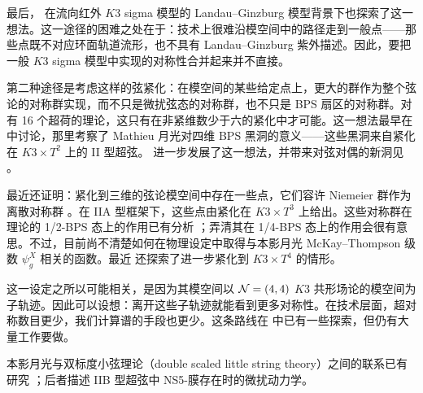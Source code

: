 
最后，\cite{UMLG} 在流向红外 $K3$ sigma 模型的 Landau--Ginzburg 模型背景下也探索了这一想法。这一途径的困难之处在于：技术上很难沿模空间中的路径走到一般点——那些点既不对应环面轨道流形，也不具有 Landau--Ginzburg 紫外描述。因此，要把一般 $K3$ sigma 模型中实现的对称性合并起来并不直接。

 第二种途径是考虑这样的弦紧化：在模空间的某些给定点上，更大的群作为整个弦论的对称群实现，而不只是微扰弦态的对称群，也不只是 BPS 扇区的对称群。对有 16 个超荷的理论，这只有在非紧维数少于六的紧化中才可能。这一想法最早在 \cite{cheng2010k3} 中讨论，那里考察了 Mathieu 月光对四维 BPS 黑洞的意义——这些黑洞来自紧化在 $K3\times T^2$ 上的 II 型超弦。\cite{Persson:2013xpa} 进一步发展了这一想法，并带来对弦对偶的新洞见 \cite{Persson:2015jka}。


最近还证明：紧化到三维的弦论模空间中存在一些点，它们容许 Niemeier 群作为离散对称群 \cite{kachru20173d}。在 IIA 型框架下，这些点由紧化在 $K3\times T^3$ 上给出。这些对称群在理论的 1/2-BPS 态上的作用已有分析 \cite{kachru20173d}；弄清其在 1/4-BPS 态上的作用会很有意思。不过，目前尚不清楚如何在物理设定中取得与本影月光 McKay--Thompson 级数 $\psi^X_g$ 相关的函数。最近 \cite{Zimet:2018dev} 还探索了进一步紧化到 $K3\times T^4$ 的情形。


 这一设定之所以可能相关，是因为其模空间以 ${\cal N}=(4,4)$ $K3$ 共形场论的模空间为子轨迹。因此可以设想：离开这些子轨迹就能看到更多对称性。在技术层面，超对称数目更少，我们计算谱的手段也更少。这条路线在 \cite{cheng2013mathieu,Harrison:2013bya} 中已有一些探索，但仍有大量工作要做。

 本影月光与双标度小弦理论（double scaled little string theory）之间的联系已有研究 \cite{Harvey:2013mda,Harvey:2014cva}；后者描述 IIB 型超弦中 NS5-膜存在时的微扰动力学。

